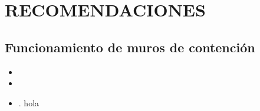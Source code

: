 \chapter[\hspace{0.2cm}RECOMENDACIONES]{RECOMENDACIONES}
\thispagestyle{empty}
\section{Funcionamiento de muros de contención}
\begin{itemize}[leftmargin=1em]
    \item \lipsum[3]
    \item \lipsum[2]
    \item \lipsum[5] \parencite{Niu2020}.
    \parencite{Niu2020} \parencite[see][p10]{Niu2020} hola \textcite{Niu2020}
\end{itemize}



